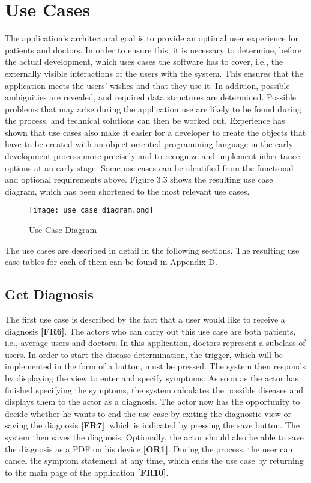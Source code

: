 \section{Use Cases}
The application's architectural goal is to provide an optimal user experience for patients and doctors. In order to ensure this, it is necessary to determine, before the actual development, which uses cases the software has to cover, i.e., the externally visible interactions of the users with the system. This ensures that the application meets the users' wishes and that they use it. In addition, possible ambiguities are revealed, and required data structures are determined. Possible problems that may arise during the application use are likely to be found during the process, and technical solutions can then be worked out. Experience has shown that use cases also make it easier for a developer to create the objects that have to be created with an object-oriented programming language in the early development process more precisely and to recognize and implement inheritance options at an early stage. Some use cases can be identified from the functional and optional requirements above. Figure 3.3 shows the resulting use case diagram, which has been shortened to the most relevant use cases. 

\begin{figure}[H]
	\centering
	\texttt{[image: use\_case\_diagram.png]}
	\caption[Use Case Diagram]{Use Case Diagram}
\end{figure}
\noindent
The use cases are described in detail in the following sections. The resulting use case tables for each of them can be found in Appendix D.

\subsection{Get Diagnosis}
The first use case is described by the fact that a user would like to receive a diagnosis \textbf{[FR6]}. The actors who can carry out this use case are both patients, i.e., average users and doctors. In this application, doctors represent a subclass of users. In order to start the disease determination, the trigger, which will be implemented in the form of a button, must be pressed. The system then responds by displaying the view to enter and specify symptoms. As soon as the actor has finished specifying the symptoms, the system calculates the possible diseases and displays them to the actor as a diagnosis. The actor now has the opportunity to decide whether he wants to end the use case by exiting the diagnostic view or saving the diagnosis \textbf{[FR7]}, which is indicated by pressing the save button. The system then saves the diagnosis. Optionally, the actor should also be able to save the diagnosis as a PDF on his device \textbf{[OR1]}. During the process, the user can cancel the symptom statement at any time, which ends the use case by returning to the main page of the application \textbf{[FR10]}.

